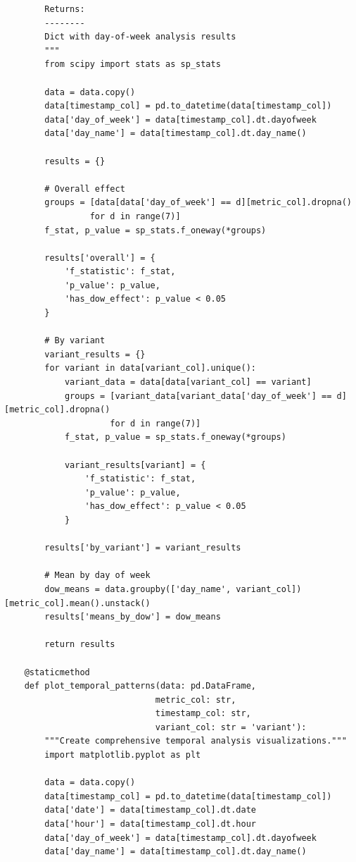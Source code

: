 \begin{lstlisting}
        Returns:
        --------
        Dict with day-of-week analysis results
        """
        from scipy import stats as sp_stats

        data = data.copy()
        data[timestamp_col] = pd.to_datetime(data[timestamp_col])
        data['day_of_week'] = data[timestamp_col].dt.dayofweek
        data['day_name'] = data[timestamp_col].dt.day_name()

        results = {}

        # Overall effect
        groups = [data[data['day_of_week'] == d][metric_col].dropna()
                 for d in range(7)]
        f_stat, p_value = sp_stats.f_oneway(*groups)

        results['overall'] = {
            'f_statistic': f_stat,
            'p_value': p_value,
            'has_dow_effect': p_value < 0.05
        }

        # By variant
        variant_results = {}
        for variant in data[variant_col].unique():
            variant_data = data[data[variant_col] == variant]
            groups = [variant_data[variant_data['day_of_week'] == d][metric_col].dropna()
                     for d in range(7)]
            f_stat, p_value = sp_stats.f_oneway(*groups)

            variant_results[variant] = {
                'f_statistic': f_stat,
                'p_value': p_value,
                'has_dow_effect': p_value < 0.05
            }

        results['by_variant'] = variant_results

        # Mean by day of week
        dow_means = data.groupby(['day_name', variant_col])[metric_col].mean().unstack()
        results['means_by_dow'] = dow_means

        return results

    @staticmethod
    def plot_temporal_patterns(data: pd.DataFrame,
                              metric_col: str,
                              timestamp_col: str,
                              variant_col: str = 'variant'):
        """Create comprehensive temporal analysis visualizations."""
        import matplotlib.pyplot as plt

        data = data.copy()
        data[timestamp_col] = pd.to_datetime(data[timestamp_col])
        data['date'] = data[timestamp_col].dt.date
        data['hour'] = data[timestamp_col].dt.hour
        data['day_of_week'] = data[timestamp_col].dt.dayofweek
        data['day_name'] = data[timestamp_col].dt.day_name()


\end{lstlisting}
